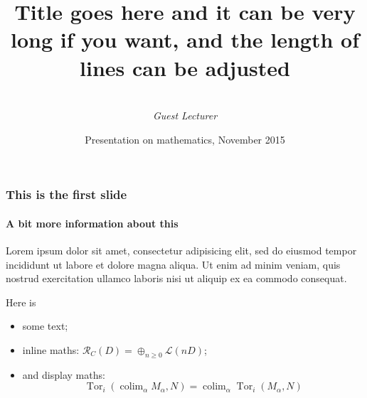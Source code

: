 \documentclass{beamer}
\title[Short version of title]{Title goes here and it can be very long if you want, and the length of lines can be adjusted} %
\author%
{%
    \sc{E. Noether}\\
    \textit{Guest Lecturer}
}
\institute%
{%
    \textit{Mathematical Institute}\\
    \textit{University of Oxford}
}
\date[PoM2015]{Presentation on mathematics, November 2015} %
\begin{document}
    \begin{frame}[plain]
        \titlepage
    \end{frame}
    \begin{frame}
        \frametitle{This is the first slide}
        \framesubtitle{A bit more information about this}
        
        Lorem ipsum dolor sit amet, consectetur adipisicing elit, sed do eiusmod
        tempor incididunt ut labore et dolore magna aliqua. Ut enim ad minim veniam,
        quis nostrud exercitation ullamco laboris nisi ut aliquip ex ea commodo
        consequat.

        Here is
        \begin{itemize}
            \item some text;
            \item inline maths: $\mathcal{R}_C(D)=\oplus_{n\geqslant0}\mathcal{L}(nD)$;
            \item and display maths:
            \[
                \operatorname{Tor}_i(\operatorname{colim}_\alpha M_\alpha, N)
                = \operatorname{colim}_\alpha\operatorname{Tor}_i(M_\alpha,N)
            \]
        \end{itemize}

    \end{frame}
\end{document}
